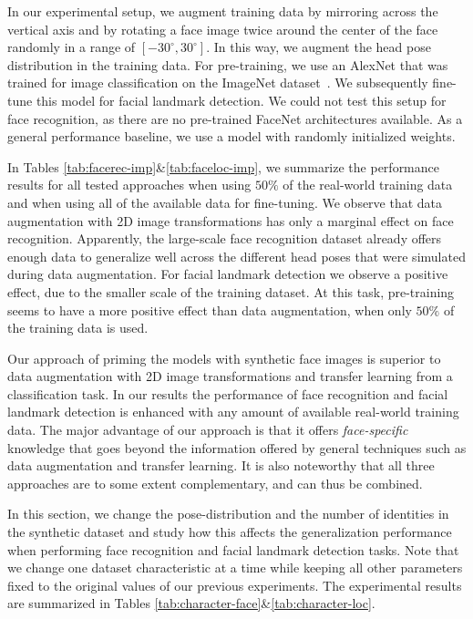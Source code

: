 \documentclass[10pt,twocolumn,letterpaper]{article}
\begin{document}
   In our experimental setup, we augment training data by mirroring across the vertical axis and by rotating a face image twice around the center of the face randomly in a range of $[-30^\circ,30^\circ]$. In this way, we augment the head pose distribution in the training data. For pre-training, we use an AlexNet \cite{krizhevsky2012imagenet,jia2014caffe} that was trained for image classification on the ImageNet dataset~\cite{russakovsky2015imagenet}. We subsequently fine-tune this model for facial landmark detection. We could not test this setup for face recognition, as there are no pre-trained FaceNet architectures available. As a general performance baseline, we use a model with randomly initialized weights.
   
   In Tables \ref{tab:facerec-imp}\&\ref{tab:faceloc-imp}, we summarize the performance results for all tested approaches when using $50\%$ of the real-world training data and when using all of the available data for fine-tuning. We observe that data augmentation with 2D image transformations has only a marginal effect on face recognition. Apparently, the large-scale face recognition dataset already offers enough data to generalize well across the different head poses that were simulated during data augmentation. For facial landmark detection we observe a positive effect, due to the smaller scale of the training dataset. At this task, pre-training seems to have a more positive effect than data augmentation, when only $50\%$ of the training data is used.
   
	Our approach of priming the models with synthetic face images is superior to data augmentation with 2D image transformations and transfer learning from a classification task. In our results the performance of face recognition and facial landmark detection is enhanced with any amount of available real-world training data. The major advantage of our approach is that it offers \textit{face-specific} knowledge that goes beyond the information offered by general techniques such as data augmentation and transfer learning. It is also noteworthy that all three approaches are to some extent complementary, and can thus be combined.  
   

	In this section, we change	the pose-distribution and the number of identities in the synthetic dataset and study how this affects the generalization performance when performing face recognition and facial landmark detection tasks. Note that we change one dataset characteristic at a time while keeping all other parameters fixed to the original values of our previous experiments. The experimental results are summarized in Tables \ref{tab:character-face}\&\ref{tab:character-loc}.     
  
\end{document}
